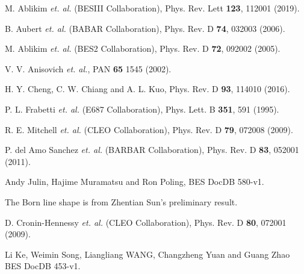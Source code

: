 \newpage
\begin{thebibliography}{99}

M. Ablikim {\it et. al.} (BESIII Collaboration),
Phys. Rev. Lett \textbf{123}, 112001 (2019).

B. Aubert {\it et. al.} (BABAR Collaboration),
Phys. Rev. D \textbf{74}, 032003 (2006).

M. Ablikim {\it et. al.} (BES2 Collaboration),
Phys. Rev. D \textbf{72}, 092002 (2005).

V. V. Anisovich {\it et. al.},
PAN \textbf{65} 1545 (2002).

    H. Y. Cheng, C. W. Chiang and A. L. Kuo,
    Phys. Rev. D \textbf{93}, 114010 (2016).


%
%
%
    P. L. Frabetti {\it et. al.} (E687 Collaboration),
    Phys. Lett. B \textbf{351}, 591 (1995).

R. E. Mitchell {\it et. al.}  (CLEO Collaboration),
Phys. Rev. D \textbf{79}, 072008 (2009).

P. del Amo Sanchez {\it et. al.} (BARBAR Collaboration),
Phys. Rev. D \textbf{83}, 052001 (2011).


Andy Julin, Hajime Muramatsu and Ron Poling,  
BES\uppercase\expandafter{} DocDB 580-v1.

The Born line shape is from Zhentian Sun's preliminary result.

D. Cronin-Hennessy {\it et. al.} (CLEO Collaboration),
Phys. Rev. D \textbf{80}, 072001 (2009).


Li Ke, Weimin Song, Liangliang WANG, Changzheng Yuan and Guang Zhao
BES\uppercase\expandafter{} DocDB 453-v1.



\end{thebibliography}
